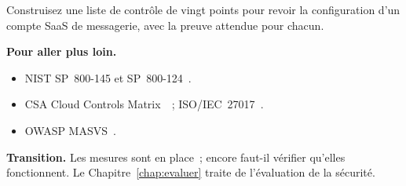 \begin{boxexo}[title={\ding{45}\quad Exercice~20.10. Revue de configuration \niveauexpert}]
Construisez une liste de contrôle de vingt points pour revoir la
configuration d'un compte SaaS de messagerie, avec la preuve attendue
pour chacun.
\end{boxexo}

\bigskip

\begin{boxinfo}
\textbf{Pour aller plus loin.}
\begin{itemize}
    \item NIST SP~800-145 et SP~800-124~\cite{nist2011sp800145,nist800124}.
    \item CSA Cloud Controls Matrix~\cite{csa2021ccm}~; ISO/IEC~27017~\cite{iso27017_2015}.
    \item OWASP MASVS~\cite{owaspmasvs}.
\end{itemize}
\end{boxinfo}

\begin{boxinfo}
\textbf{Transition.} Les mesures sont en place~; encore faut-il vérifier
qu'elles fonctionnent. Le Chapitre~\ref{chap:evaluer} traite de
l'évaluation de la sécurité.
\end{boxinfo}
